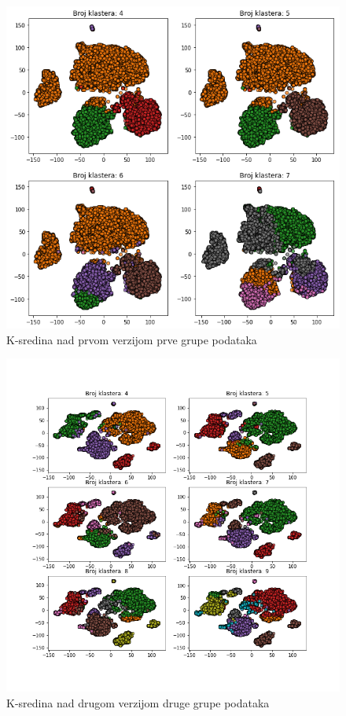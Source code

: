 \documentclass[a4paper]{article}
\begin{document}
\begin{figure}[H]
\centering
\includegraphics[scale=0.6]{kmeans_nmf_vise_klastera}
\caption{K-sredina nad prvom verzijom prve grupe podataka}
\label{kmeans_nmf_vise_klastera}
\end{figure}



\begin{figure}[H]
\centering
\includegraphics[scale=0.6]{kmeans_grp1v2}
\caption{K-sredina nad drugom verzijom druge grupe podataka}
\label{kmeans_grp1v2}
\end{figure}
\end{document}
